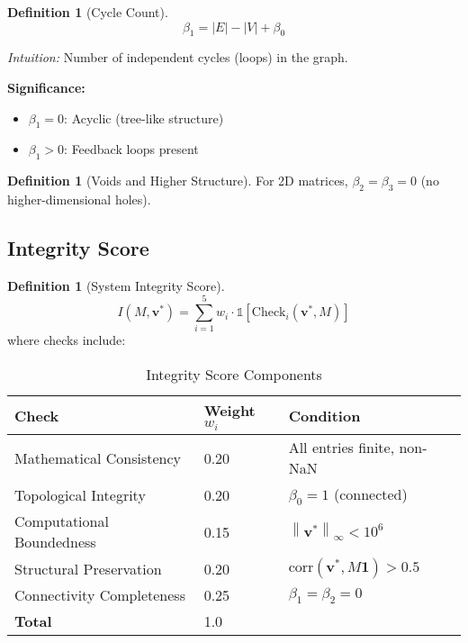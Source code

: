 \documentclass[11pt,a4paper]{article}
\theoremstyle{definition}
\newtheorem{definition}[theorem]{Definition}
\theoremstyle{remark}
\newcommand{\norm}[1]{\left\|#1\right\|}
\newcommand{\abs}[1]{\left|#1\right|}
\begin{document}
\begin{definition}[Cycle Count]\label{def:beta1}
\begin{equation}
\beta_1 = \abs{E} - \abs{V} + \beta_0
\end{equation}
\end{definition}

\textit{Intuition:} Number of independent cycles (loops) in the graph.

\textbf{Significance:}
\begin{itemize}
\item $\beta_1 = 0$: Acyclic (tree-like structure)
\item $\beta_1 > 0$: Feedback loops present
\end{itemize}

\begin{definition}[Voids and Higher Structure]\label{def:higher}
For 2D matrices, $\beta_2 = \beta_3 = 0$ (no higher-dimensional holes).
\end{definition}

\subsection{Integrity Score}

\begin{definition}[System Integrity Score]\label{def:integrity}
\begin{equation}
I(M, \mathbf{v}^*) = \sum_{i=1}^{5} w_i \cdot \mathbb{1}[\text{Check}_i(\mathbf{v}^*, M)]
\end{equation}
where checks include:
\end{definition}

\begin{table}[h]
\centering
\begin{tabular}{lll}
\toprule
\textbf{Check} & \textbf{Weight $w_i$} & \textbf{Condition} \\
\midrule
Mathematical Consistency & 0.20 & All entries finite, non-NaN \\
Topological Integrity & 0.20 & $\beta_0 = 1$ (connected) \\
Computational Boundedness & 0.15 & $\norm{\mathbf{v}^*}_\infty < 10^6$ \\
Structural Preservation & 0.20 & $\text{corr}(\mathbf{v}^*, M \mathbf{1}) > 0.5$ \\
Connectivity Completeness & 0.25 & $\beta_1 = \beta_2 = 0$ \\
\midrule
\textbf{Total} & 1.0 & \\
\bottomrule
\end{tabular}
\caption{Integrity Score Components}
\label{tab:integrity}
\end{table}
\end{document}
